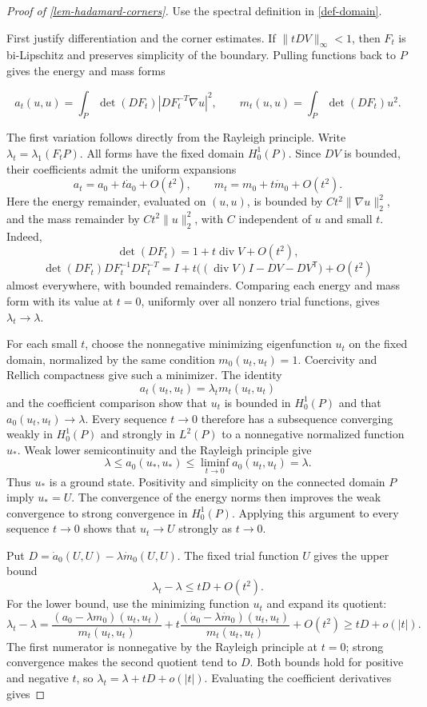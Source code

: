 \documentclass[11pt,a4paper]{article}
\theoremstyle{proofmanuscript}
\begin{document}
\begin{proof}[Proof of \ref{lem-hadamard-corners}]

Use the spectral definition in \ref{def-domain}.

First justify differentiation and the corner estimates. If \(\|tDV\|_\infty<1\), then \(F_t\) is bi-Lipschitz and preserves simplicity of the boundary. Pulling functions back to \(P\) gives the energy and mass forms

\[
a_t(u,u)=\int_P\det(DF_t)|DF_t^{-T}\nabla u|^2,
\qquad m_t(u,u)=\int_P\det(DF_t)u^2.
\]

The first variation follows directly from the Rayleigh principle. Write \(\lambda_t=\lambda_1(F_tP)\). All forms have the fixed domain \(H_0^1(P)\). Since \(DV\) is bounded, their coefficients admit the uniform expansions \[
a_t=a_0+t\dot a_0+O(t^2),\qquad
m_t=m_0+t\dot m_0+O(t^2).
\] Here the energy remainder, evaluated on \((u,u)\), is bounded by \(Ct^2\|\nabla u\|_2^2\), and the mass remainder by \(Ct^2\|u\|_2^2\), with \(C\) independent of \(u\) and small \(t\). Indeed, \[
\det(DF_t)=1+t\operatorname{div}V+O(t^2),
\] \[
\det(DF_t)DF_t^{-1}DF_t^{-T}
=I+t\bigl((\operatorname{div}V)I-DV-DV^{\mathsf T}\bigr)+O(t^2)
\] almost everywhere, with bounded remainders. Comparing each energy and mass form with its value at \(t=0\), uniformly over all nonzero trial functions, gives \(\lambda_t\to\lambda\).

For each small \(t\), choose the nonnegative minimizing eigenfunction \(u_t\) on the fixed domain, normalized by the same condition \(m_0(u_t,u_t)=1\). Coercivity and Rellich compactness give such a minimizer. The identity \[
a_t(u_t,u_t)=\lambda_t m_t(u_t,u_t)
\] and the coefficient comparison show that \(u_t\) is bounded in \(H_0^1(P)\) and that \(a_0(u_t,u_t)\to\lambda\). Every sequence \(t\to0\) therefore has a subsequence converging weakly in \(H_0^1(P)\) and strongly in \(L^2(P)\) to a nonnegative normalized function \(u_*\). Weak lower semicontinuity and the Rayleigh principle give \[
\lambda\le a_0(u_*,u_*)\le\liminf_{t\to0}a_0(u_t,u_t)=\lambda.
\] Thus \(u_*\) is a ground state. Positivity and simplicity on the connected domain \(P\) imply \(u_*=U\). The convergence of the energy norms then improves the weak convergence to strong convergence in \(H_0^1(P)\). Applying this argument to every sequence \(t\to0\) shows that \(u_t\to U\) strongly as \(t\to0\).

Put \(D=\dot a_0(U,U)-\lambda\dot m_0(U,U)\). The fixed trial function \(U\) gives the upper bound \[
\lambda_t-\lambda\le tD+O(t^2).
\] For the lower bound, use the minimizing function \(u_t\) and expand its quotient: \[
\lambda_t-\lambda
=\frac{(a_0-\lambda m_0)(u_t,u_t)}{m_t(u_t,u_t)}
+t\frac{(\dot a_0-\lambda\dot m_0)(u_t,u_t)}{m_t(u_t,u_t)}
+O(t^2)
\ge tD+o(|t|).
\] The first numerator is nonnegative by the Rayleigh principle at \(t=0\); strong convergence makes the second quotient tend to \(D\). Both bounds hold for positive and negative \(t\), so \(\lambda_t=\lambda+tD+o(|t|)\). Evaluating the coefficient derivatives gives


\end{proof}
\end{document}
